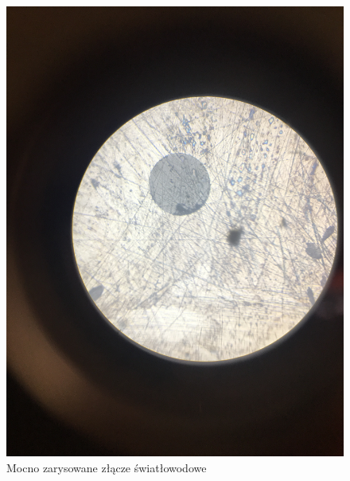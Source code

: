 \documentclass[12pt, a4paper, oneside]{article}
\begin{document}
\clearpage
\begin{figure}[t]
\centering
\caption{Mocno zarysowane złącze światłowodowe}
\includegraphics[scale=0.1]{m5.jpg}
\end{figure}
\end{document}
